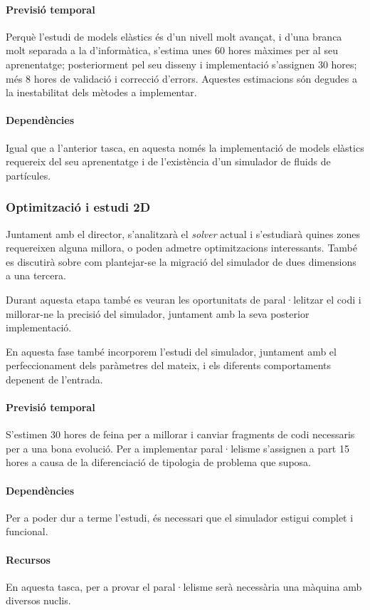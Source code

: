 \documentclass[a4paper]{article} %
\begin{document}
	\paragraph{\quad Previsió temporal} Perquè l'estudi de models elàstics és d'un nivell molt avançat, i d'una branca molt separada a la d'informàtica, s'estima unes 60 hores màximes per al seu aprenentatge; posteriorment pel seu disseny i implementació s'assignen 30 hores; més 8 hores de validació i correcció d'errors. Aquestes estimacions són degudes a la inestabilitat dels mètodes a implementar.
	\paragraph{\quad Dependències} Igual que a l'anterior tasca, en aquesta només la implementació de models elàstics requereix del seu aprenentatge i de l'existència d'un simulador de fluids de partícules.
	
	\subsubsection{Optimització i estudi 2D}
	Juntament amb el director, s'analitzarà el \textit{solver} actual i s'estudiarà quines zones requereixen alguna millora, o poden admetre optimitzacions interessants. També es discutirà sobre com plantejar-se la migració del simulador de dues dimensions a una tercera. \par
	Durant aquesta etapa també es veuran les oportunitats de paral·lelitzar el codi i millorar-ne la precisió del simulador, juntament amb la seva posterior implementació.\par
	En aquesta fase també incorporem l'estudi del simulador, juntament amb el perfeccionament dels paràmetres del mateix, i els diferents comportaments depenent de l'entrada.
	\paragraph{\quad Previsió temporal} S'estimen 30 hores de feina per a millorar i canviar fragments de codi necessaris per a una bona evolució. Per a implementar paral·lelisme s'assignen a part 15 hores a causa de la diferenciació de tipologia de problema que suposa.
	\paragraph{\quad Dependències} Per a poder dur a terme l'estudi, és necessari que el simulador estigui complet i funcional.
	\paragraph{\quad Recursos} En aquesta tasca, per a provar el paral·lelisme serà necessària una màquina amb diversos nuclis.
	
\end{document}
